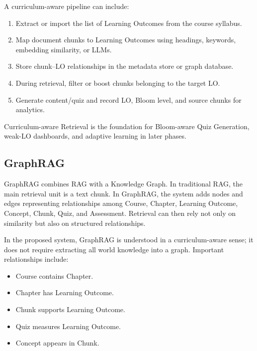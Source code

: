 A curriculum-aware pipeline can include:

\begin{enumerate}
    \item Extract or import the list of Learning Outcomes from the course
          syllabus.
    \item Map document chunks to Learning Outcomes using headings,
          keywords, embedding similarity, or LLMs.
    \item Store chunk--LO relationships in the metadata store or graph
          database.
    \item During retrieval, filter or boost chunks belonging to the target
          LO.
    \item Generate content/quiz and record LO, Bloom level, and source
          chunks for analytics.
\end{enumerate}

Curriculum-aware Retrieval is the foundation for Bloom-aware Quiz
Generation, weak-LO dashboards, and adaptive learning in later phases.

\subsection{GraphRAG}
\label{subsec:graphrag}

GraphRAG combines RAG with a Knowledge Graph. In traditional RAG, the main
retrieval unit is a text chunk. In GraphRAG, the system adds nodes and
edges representing relationships among Course, Chapter, Learning Outcome,
Concept, Chunk, Quiz, and Assessment. Retrieval can then rely not only on
similarity but also on structured relationships.

In the proposed system, GraphRAG is understood in a curriculum-aware
sense; it does not require extracting all world knowledge into a graph.
Important relationships include:

\begin{itemize}
    \item Course contains Chapter.
    \item Chapter has Learning Outcome.
    \item Chunk supports Learning Outcome.
    \item Quiz measures Learning Outcome.
    \item Concept appears in Chunk.
\end{itemize}

